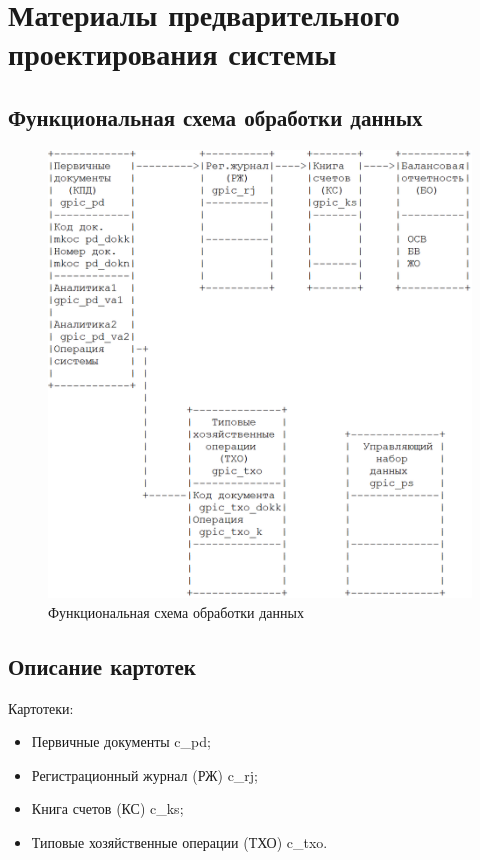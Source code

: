 \section{Материалы предварительного проектирования системы}
\subsection{Функциональная схема обработки данных}

\begin{figure}[!htb]
    \centering
    \includegraphics[width=18cm]
        {_assets/gpic_part2.png}
    \caption{Функциональная схема обработки данных}
\end{figure}

\newpage

\subsection{Описание картотек}

Картотеки:

\begin{itemize}
    \item Первичные документы \gpiFIO\/c\_pd;
    \item Регистрационный журнал (РЖ) \gpiFIO\/c\_rj;
    \item Книга счетов (КС) \gpiFIO\/c\_ks;
    \item Типовые хозяйственные операции (ТХО) \gpiFIO\/c\_txo.
\end{itemize}

